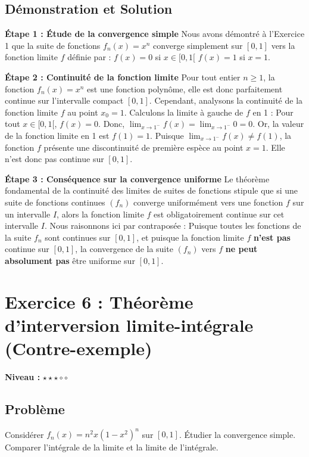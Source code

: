 \documentclass{report}
\begin{document}
\section*{Démonstration et Solution}

\textbf{Étape 1 : Étude de la convergence simple}
Nous avons démontré à l'Exercice 1 que la suite de fonctions $f_n(x) = x^n$ converge simplement sur $[0,1]$ vers la fonction limite $f$ définie par :
$f(x) = 0$ si $x \in [0, 1[$
$f(x) = 1$ si $x = 1$.

\textbf{Étape 2 : Continuité de la fonction limite}
Pour tout entier $n \geq 1$, la fonction $f_n(x) = x^n$ est une fonction polynôme, elle est donc parfaitement continue sur l'intervalle compact $[0,1]$.
Cependant, analysons la continuité de la fonction limite $f$ au point $x_0 = 1$.
Calculons la limite à gauche de $f$ en 1 :
Pour tout $x \in [0, 1[$, $f(x) = 0$. Donc, $\lim_{x \to 1^-} f(x) = \lim_{x \to 1^-} 0 = 0$.
Or, la valeur de la fonction limite en 1 est $f(1) = 1$.
Puisque $\lim_{x \to 1^-} f(x) \neq f(1)$, la fonction $f$ présente une discontinuité de première espèce au point $x=1$. Elle n'est donc pas continue sur $[0,1]$.

\textbf{Étape 3 : Conséquence sur la convergence uniforme}
Le théorème fondamental de la continuité des limites de suites de fonctions stipule que si une suite de fonctions continues $(f_n)$ converge uniformément vers une fonction $f$ sur un intervalle $I$, alors la fonction limite $f$ est obligatoirement continue sur cet intervalle $I$.
Nous raisonnons ici par contraposée :
Puisque toutes les fonctions de la suite $f_n$ sont continues sur $[0,1]$, et puisque la fonction limite $f$ \textbf{n'est pas} continue sur $[0,1]$, la convergence de la suite $(f_n)$ vers $f$ \textbf{ne peut absolument pas} être uniforme sur $[0,1]$.

\newpage


\chapter*{Exercice 6 : Théorème d'interversion limite-intégrale (Contre-exemple)}

\textbf{Niveau :} $\star \star \star \circ \circ $

\section*{Problème}

Considérer $f_n(x) = n^2 x (1-x^2)^n$ sur $[0,1]$. Étudier la convergence simple. Comparer l'intégrale de la limite et la limite de l'intégrale.
\end{document}

